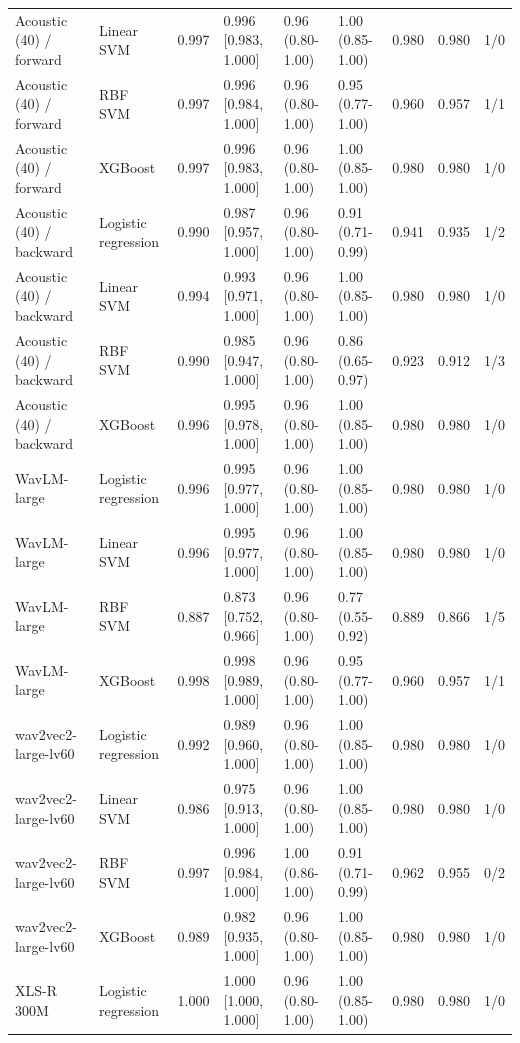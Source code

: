 \documentclass[10pt,a4paper]{article}
\begin{document}
\begin{center}
\begin{longtable}{p{3.0cm}p{2.0cm}rlllrrl}
Acoustic (40) / forward & Linear SVM & 0.997 & 0.996 [0.983, 1.000] & 0.96 (0.80-1.00) & 1.00 (0.85-1.00) & 0.980 & 0.980 & 1/0\\
Acoustic (40) / forward & RBF SVM & 0.997 & 0.996 [0.984, 1.000] & 0.96 (0.80-1.00) & 0.95 (0.77-1.00) & 0.960 & 0.957 & 1/1\\
Acoustic (40) / forward & XGBoost & 0.997 & 0.996 [0.983, 1.000] & 0.96 (0.80-1.00) & 1.00 (0.85-1.00) & 0.980 & 0.980 & 1/0\\
Acoustic (40) / backward & Logistic regression & 0.990 & 0.987 [0.957, 1.000] & 0.96 (0.80-1.00) & 0.91 (0.71-0.99) & 0.941 & 0.935 & 1/2\\
Acoustic (40) / backward & Linear SVM & 0.994 & 0.993 [0.971, 1.000] & 0.96 (0.80-1.00) & 1.00 (0.85-1.00) & 0.980 & 0.980 & 1/0\\
Acoustic (40) / backward & RBF SVM & 0.990 & 0.985 [0.947, 1.000] & 0.96 (0.80-1.00) & 0.86 (0.65-0.97) & 0.923 & 0.912 & 1/3\\
Acoustic (40) / backward & XGBoost & 0.996 & 0.995 [0.978, 1.000] & 0.96 (0.80-1.00) & 1.00 (0.85-1.00) & 0.980 & 0.980 & 1/0\\
WavLM-large & Logistic regression & 0.996 & 0.995 [0.977, 1.000] & 0.96 (0.80-1.00) & 1.00 (0.85-1.00) & 0.980 & 0.980 & 1/0\\
WavLM-large & Linear SVM & 0.996 & 0.995 [0.977, 1.000] & 0.96 (0.80-1.00) & 1.00 (0.85-1.00) & 0.980 & 0.980 & 1/0\\
WavLM-large & RBF SVM & 0.887 & 0.873 [0.752, 0.966] & 0.96 (0.80-1.00) & 0.77 (0.55-0.92) & 0.889 & 0.866 & 1/5\\
WavLM-large & XGBoost & 0.998 & 0.998 [0.989, 1.000] & 0.96 (0.80-1.00) & 0.95 (0.77-1.00) & 0.960 & 0.957 & 1/1\\
wav2vec2-large-lv60 & Logistic regression & 0.992 & 0.989 [0.960, 1.000] & 0.96 (0.80-1.00) & 1.00 (0.85-1.00) & 0.980 & 0.980 & 1/0\\
wav2vec2-large-lv60 & Linear SVM & 0.986 & 0.975 [0.913, 1.000] & 0.96 (0.80-1.00) & 1.00 (0.85-1.00) & 0.980 & 0.980 & 1/0\\
wav2vec2-large-lv60 & RBF SVM & 0.997 & 0.996 [0.984, 1.000] & 1.00 (0.86-1.00) & 0.91 (0.71-0.99) & 0.962 & 0.955 & 0/2\\
wav2vec2-large-lv60 & XGBoost & 0.989 & 0.982 [0.935, 1.000] & 0.96 (0.80-1.00) & 1.00 (0.85-1.00) & 0.980 & 0.980 & 1/0\\
XLS-R 300M & Logistic regression & 1.000 & 1.000 [1.000, 1.000] & 0.96 (0.80-1.00) & 1.00 (0.85-1.00) & 0.980 & 0.980 & 1/0\\

\end{longtable}
\end{center}
\end{document}
